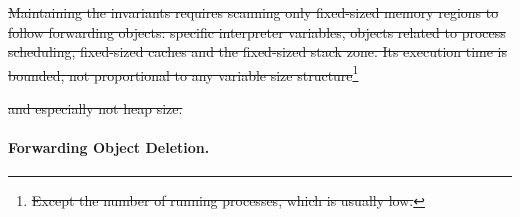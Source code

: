 \documentclass[sigplan,10pt,review,anonymous]{acmart}\settopmatter{printfolios=true,printccs=false,printacmref=false}
\newcommand{\egb}[1]{\color{blue}\fbox{\bfseries\sffamily\scriptsize Elisa:}{\sf\small$\blacktriangleright$\textit{#1}$\blacktriangleleft$}\color{black}}
\newcommand{\eem}[1]{\color{olive}\fbox{\bfseries\sffamily\scriptsize Eliot:}{\sf\small$\blacktriangleright$\textit{#1}$\blacktriangleleft$}\color{black}}
\providecommand{\DIFdel}[1]{{\protect\color{red}\sout{#1}}}                      %
\providecommand{\DIFdelbegin}{} %
\providecommand{\DIFdelend}{} %
\begin{document}

\DIFdelbegin \DIFdel{Maintaining the invariants requires scanning only fixed-sized memory regions to follow forwarding objects: specific interpreter variables, objects related to process scheduling, fixed-sized caches and the fixed-sized stack zone. Its execution time is bounded, not proportional to any variable size structure}\footnote{\DIFdel{Except the number of running processes, which is usually low.}} %
\addtocounter{footnote}{-1}%
\DIFdel{and especially not heap size.
}\DIFdelend %


\paragraph{Forwarding Object Deletion.}
\end{document}
